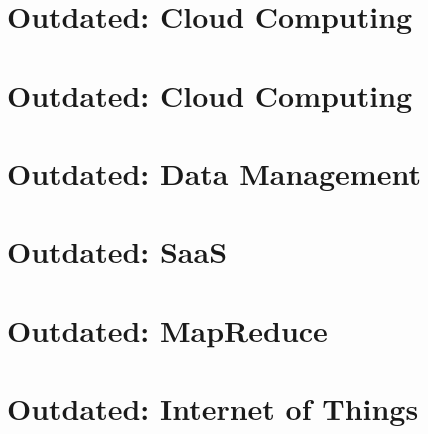 \part{Outdated: Cloud Computing}





\part{Outdated: Cloud Computing}

%
%





\part{Outdated: Data Management}



\part{Outdated: SaaS}
\label{sec:icloud-saas}



\part{Outdated: MapReduce}





%
%

\part{Outdated: Internet of Things}


